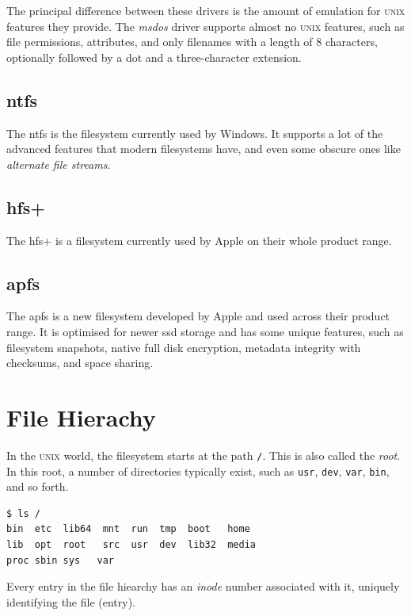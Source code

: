 \documentclass[a4paper]{article}
\begin{document}
The principal difference between these drivers is the amount of emulation for \textsc{unix} features they provide. The \emph{msdos} driver supports almost no \textsc{unix} features, such as file permissions, attributes, and only filenames with a length of 8 characters, optionally followed by a dot and a three-character extension.

\subsection{\glsdesc*{ntfs}}

The \gls{ntfs} is the filesystem currently used by Windows. It supports a lot of the advanced features that modern filesystems have, and even some obscure ones like \emph{alternate file streams}.

\subsection{\glsdesc*{hfs+}}

The \gls{hfs+} is a filesystem currently used by Apple on their whole product range.

\subsection{\glsdesc*{apfs}}

The \gls{apfs} is a new filesystem developed by Apple and used across their product range. It is optimised for newer \gls{ssd} storage and has some unique features, such as filesystem snapshots, native full disk encryption, metadata integrity with checksums, and space sharing.

\section{File Hierachy}

In the \textsc{unix} world, the filesystem starts at the path \verb|/|. This is also called the \emph{root}. In this root, a number of directories typically exist, such as \verb|usr|, \verb|dev|, \verb|var|, \verb|bin|, and so forth.

\begin{verbatim}
$ ls /
bin  etc  lib64  mnt  run  tmp  boot   home 
lib  opt  root   src  usr  dev  lib32  media 
proc sbin sys   var
\end{verbatim}

Every entry in the file hiearchy has an \emph{inode} number associated with it, uniquely identifying the file (entry).
\end{document}
